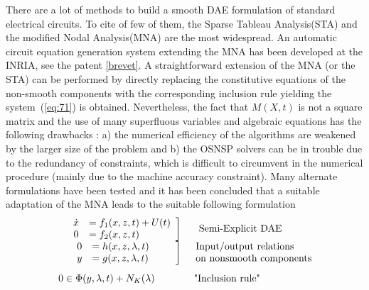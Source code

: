  There are a lot of methods to build a smooth DAE formulation of standard electrical circuits. To cite of few of them, the Sparse Tableau Analysis(STA) and the modified Nodal Analysis(MNA) are the most widespread. An automatic circuit equation generation system extending the MNA has been developed at the INRIA, see the patent \ref{brevet}. A straightforward extension of the MNA (or the STA) can be performed by directly replacing the constitutive equations of the non-smooth components with the corresponding inclusion rule yielding the system~(\ref{eq:71}) is obtained.  Nevertheless, the fact that $M(X,t)$ is not a square matrix and the use of many superfluous variables and algebraic equations has the following drawbacks : a) the numerical efficiency of the algorithms are weakened by the larger size of the problem and b) the OSNSP solvers can be in trouble due to the redundancy of constraints, which is difficult to circumvent in the numerical procedure (mainly due to the machine accuracy constraint). Many alternate formulations have been tested and it has been concluded that a suitable adaptation of the MNA leads to the suitable following formulation
\begin{equation}
  \label{eq:SEDGE}
{  \begin{array}{r l}
      \left.\begin{array}{cl}
        \dot x 
               & = f_1(x,z,t) + U(t) \\
            0   & =  f_2(x,z,t)
      \end{array}\right]
    &
    \begin{array}{l}
      \text{ Semi-Explicit DAE}
    \end{array}
    \\[2mm]
  \left.\begin{array}{cl}
0 &= h(x,z,\lambda,t)\quad\quad\,\\
y &= g(x,z,\lambda,t)\\
  \end{array}\right] & \begin{array}{l}
   \text{Input/output relations }\\
   \text{on nonsmooth components}
  \end{array} \\[5mm]
  \left.\begin{array}{l}
  0 \in \Phi(y,\lambda,t) + N_K(\lambda)\quad\quad
\end{array}\right.
& \text{ "Inclusion rule"}\\ \\
\end{array}}
\end{equation}
